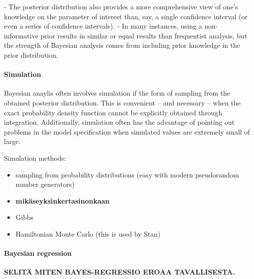 - The posterior distribution also provides a more comprehensive view of
one's knowledge on the parameter of interest than, say, a single confidence
interval (or even a series of confidence intervals).
- In many instances, using a non-informative prior results in similar or
equal results than frequentist analysis, but the strength of Bayesian
analysis comes from including prior knowledge in the prior distribution. \citep{Jaynes?}


\paragraph{Simulation}\label{simulation}

Bayesian anaylis often involves simulation if the form of sampling from the
obtained posterior distribution. This is convenient -- and necessary -- when
the exact probability density function cannot be explicitly obtained through
integration. Additionally, simulation often has the advantage of pointing out
problems in the model specification when simulated values are extremely small
of large.

Simulation methods:
\begin{itemize}
  \item
  sampling from probability distributions (easy with modern pseudorandom
  number generators)
  \item
  \textbf{mikäseyksinkertasinonkaan}
  \item
  Gibbs
  \item
  Hamiltonian Monte Carlo (this is used by Stan)
\end{itemize}


\paragraph{Bayesian regression}\label{bayesian-regression}

\textbf{SELITÄ MITEN BAYES-REGRESSIO EROAA TAVALLISESTA.}
